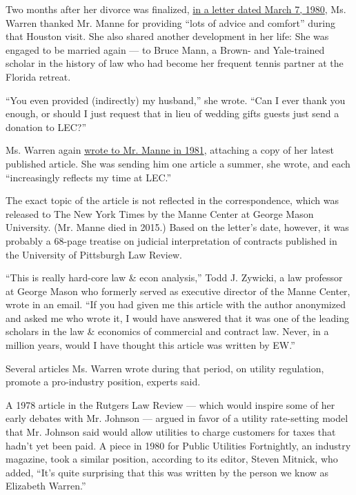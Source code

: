 Two months after her divorce was finalized,
\href{https://int.nyt.com/data/documenthelper/1648-warren-to-manne-3-7-1980-1-1/a741af593ce52226ffe3/optimized/full.pdf\#page=1}{in
a letter dated March 7, 1980}, Ms. Warren thanked Mr. Manne for
providing ``lots of advice and comfort'' during that Houston visit. She
also shared another development in her life: She was engaged to be
married again --- to Bruce Mann, a Brown- and Yale-trained scholar in
the history of law who had become her frequent tennis partner at the
Florida retreat.

``You even provided (indirectly) my husband,'' she wrote. ``Can I ever
thank you enough, or should I just request that in lieu of wedding gifts
guests just send a donation to LEC?''

Ms. Warren again
\href{https://int.nyt.com/data/documenthelper/1650-gmu-00006434-pdf/a741af593ce52226ffe3/optimized/full.pdf\#page=2}{wrote
to Mr. Manne in 1981}, attaching a copy of her latest published article.
She was sending him one article a summer, she wrote, and each
``increasingly reflects my time at LEC.''

The exact topic of the article is not reflected in the correspondence,
which was released to The New York Times by the Manne Center at George
Mason University. (Mr. Manne died in 2015.) Based on the letter's date,
however, it was probably a 68-page treatise on judicial interpretation
of contracts published in the University of Pittsburgh Law Review.

``This is really hard-core law \& econ analysis,'' Todd J. Zywicki, a
law professor at George Mason who formerly served as executive director
of the Manne Center, wrote in an email. ``If you had given me this
article with the author anonymized and asked me who wrote it, I would
have answered that it was one of the leading scholars in the law \&
economics of commercial and contract law. Never, in a million years,
would I have thought this article was written by EW.''

Several articles Ms. Warren wrote during that period, on utility
regulation, promote a pro-industry position, experts said.

A 1978 article in the Rutgers Law Review --- which would inspire some of
her early debates with Mr. Johnson --- argued in favor of a utility
rate-setting model that Mr. Johnson said would allow utilities to charge
customers for taxes that hadn't yet been paid. A piece in 1980 for
Public Utilities Fortnightly, an industry magazine, took a similar
position, according to its editor, Steven Mitnick, who added, ``It's
quite surprising that this was written by the person we know as
Elizabeth Warren.''


